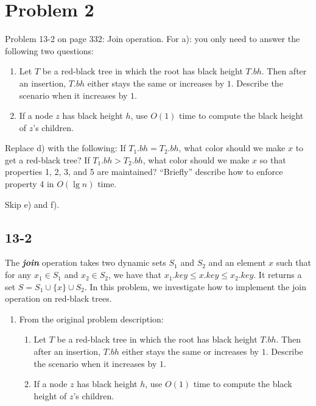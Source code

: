 \documentclass{../../class}
\begin{document}
\newpage
\section*{Problem 2}
\begin{tcolorbox}
    Problem 13-2 on page 332: Join operation. For a): you only need to answer the following two questions:
    \begin{enumerate}
        \item Let $T$ be a red-black tree in which the root has black height $T.bh$. Then after an insertion, $T.bh$ either stays the same or increases by $1$. Describe the scenario when it increases by $1$.
        \item If a node $z$ has black height $h$, use $O(1)$ time to compute the black height of $z$'s children.
    \end{enumerate} 
    Replace d) with the following: If $T_1.bh = T_2.bh$, what color should we make $x$ to get a red-black tree? If $T_1.bh > T_2.bh$, what color should we make $x$ so that properties 1, 2, 3, and 5 are maintained? \enquote{Briefly} describe how to enforce property 4 in $O(\lg{n})$ time.

    Skip e) and f).
\end{tcolorbox}

\subsection*{13-2}
The \textbf{\textit{join}} operation takes two dynamic sets $S_1$ and $S_2$ and an element $x$ such that for any $x_1 \in S_1$ and $x_2 \in S_2$, we have that $x_1.key \leq x.key \leq x_2.key$. It returns a set $S = S_1 \cup \{x\} \cup S_2$. In this problem, we investigate how to implement the join operation on red-black trees.
\begin{enumerate}[label=\textbf{\textit{\alph*}}.]
    \item From the original problem description:
    \begin{enumerate}[1.]
        \item Let $T$ be a red-black tree in which the root has black height $T.bh$. Then after an insertion, $T.bh$ either stays the same or increases by $1$. Describe the scenario when it increases by $1$.
        \item If a node $z$ has black height $h$, use $O(1)$ time to compute the black height of $z$'s children.
    \end{enumerate} 
\end{enumerate}
\end{document}
